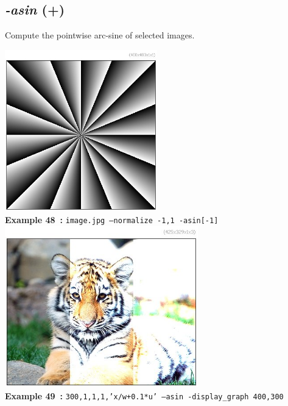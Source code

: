 \documentclass[a4paper,11pt,twoside]{book}
\begin{document}
\subsection{\emph{-asin} (+)}\vspace*{-0.5em}
Compute the pointwise arc-sine of selected images.
\begin{center}\includegraphics[keepaspectratio=true,height=7cm,width=\textwidth]{img/gmic_def48.jpg}\\
{\footnotesize \textbf{Example 48~:} \texttt{image.jpg --normalize -1,1 -asin[-1]}}
\\\includegraphics[keepaspectratio=true,height=7cm,width=\textwidth]{img/gmic_def49.jpg}\\
{\footnotesize \textbf{Example 49~:} \texttt{300,1,1,1,'x/w+0.1*u' --asin -display\_graph 400,300}}
\end{center}
\end{document}
